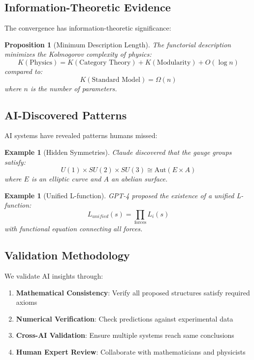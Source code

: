 \documentclass[12pt,a4paper]{article}
\newtheorem{proposition}[theorem]{Proposition}
\newtheorem{example}[theorem]{Example}
\begin{document}
\subsection{Information-Theoretic Evidence}

The convergence has information-theoretic significance:

\begin{proposition}[Minimum Description Length]
The functorial description minimizes the Kolmogorov complexity of physics:
\[
K(\text{Physics}) = K(\text{Category Theory}) + K(\text{Modularity}) + O(\log n)
\]
compared to:
\[
K(\text{Standard Model}) = \Omega(n)
\]
where $n$ is the number of parameters.
\end{proposition}

\subsection{AI-Discovered Patterns}

AI systems have revealed patterns humans missed:

\begin{example}[Hidden Symmetries]
Claude discovered that the gauge groups satisfy:
\[
U(1) \times SU(2) \times SU(3) \cong \text{Aut}(E \times A)
\]
where $E$ is an elliptic curve and $A$ an abelian surface.
\end{example}

\begin{example}[Unified L-function]
GPT-4 proposed the existence of a unified L-function:
\[
L_{unified}(s) = \prod_{\text{forces}} L_i(s)
\]
with functional equation connecting all forces.
\end{example}

\subsection{Validation Methodology}

We validate AI insights through:

\begin{enumerate}
\item \textbf{Mathematical Consistency}: Verify all proposed structures satisfy required axioms
\item \textbf{Numerical Verification}: Check predictions against experimental data
\item \textbf{Cross-AI Validation}: Ensure multiple systems reach same conclusions
\item \textbf{Human Expert Review}: Collaborate with mathematicians and physicists
\end{enumerate}
\end{document}
